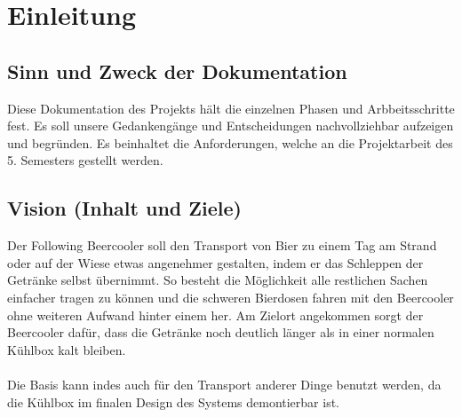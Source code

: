 \section{Einleitung}

\subsection{Sinn und Zweck der Dokumentation}
Diese Dokumentation des Projekts hält die einzelnen Phasen und Arbbeitsschritte fest. Es soll unsere Gedankengänge und Entscheidungen nachvollziehbar aufzeigen und begründen. Es beinhaltet die Anforderungen, welche an die Projektarbeit des 5. Semesters gestellt werden.

\subsection{Vision (Inhalt und Ziele)}
Der Following Beercooler soll den Transport von Bier zu einem Tag am Strand oder auf der Wiese etwas angenehmer gestalten, indem er das Schleppen der Getränke selbst übernimmt. So besteht die Möglichkeit alle restlichen Sachen einfacher tragen zu können und die schweren Bierdosen fahren mit den Beercooler ohne weiteren Aufwand hinter einem her. Am Zielort angekommen sorgt der Beercooler dafür, dass die Getränke noch deutlich länger als in einer normalen Kühlbox kalt bleiben. 
\\ \\
Die Basis kann indes auch für den Transport anderer Dinge benutzt werden, da die Kühlbox im finalen Design des Systems demontierbar ist.

